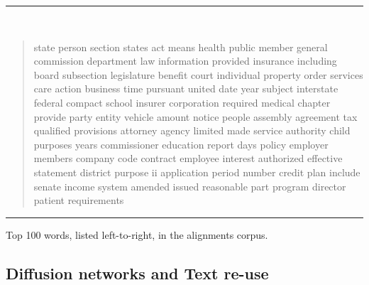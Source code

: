 \documentclass[12pt]{article} %
\begin{document}
\begin{table}[ht]
\rule{\textwidth}{1pt} \\ \vspace{-1cm}
\begin{quotation}
\noindent state person section states act means health public member general commission department law information provided insurance including board subsection legislature benefit court individual property order services care action business time pursuant united date year subject interstate federal compact school insurer corporation required medical chapter provide party entity vehicle amount notice people assembly agreement tax qualified provisions attorney agency limited made service authority child purposes years commissioner education report days policy employer members company code contract employee interest authorized effective statement district purpose ii application period number credit plan include senate income system amended issued reasonable part program director patient requirements
\end{quotation} \vspace{-.5cm}
\rule{\textwidth}{1pt} \vspace{-.2cm}
\caption{Top 100 words, listed left-to-right, in the alignments corpus.}
\label{tab:top100words}
\end{table}




\subsection{Diffusion networks and Text re-use}
\end{document}
